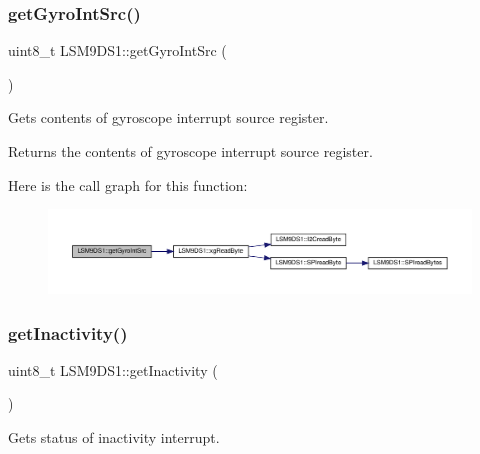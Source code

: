 \subsubsection{\texorpdfstring{get\+Gyro\+Int\+Src()}{getGyroIntSrc()}}
{\footnotesize\ttfamily uint8\+\_\+t L\+S\+M9\+D\+S1\+::get\+Gyro\+Int\+Src (\begin{DoxyParamCaption}{ }\end{DoxyParamCaption})}



Gets contents of gyroscope interrupt source register. 

\begin{DoxyReturn}{Returns}
the contents of gyroscope interrupt source register. 
\end{DoxyReturn}
Here is the call graph for this function\+:\nopagebreak
\begin{figure}[H]
\begin{center}
\leavevmode
\includegraphics[width=350pt]{classLSM9DS1_aaba6696754df62a411a6a190100f9ca3_cgraph}
\end{center}
\end{figure}
\mbox{\label{classLSM9DS1_a9dab029d1d24e49709258d893042d28f}} 
\subsubsection{\texorpdfstring{get\+Inactivity()}{getInactivity()}}
{\footnotesize\ttfamily uint8\+\_\+t L\+S\+M9\+D\+S1\+::get\+Inactivity (\begin{DoxyParamCaption}{ }\end{DoxyParamCaption})}



Gets status of inactivity interrupt. 

